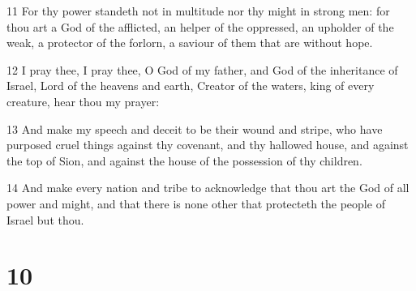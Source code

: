 \par 11 For thy power standeth not in multitude nor thy might in strong men: for thou art a God of the afflicted, an helper of the oppressed, an upholder of the weak, a protector of the forlorn, a saviour of them that are without hope.
\par 12 I pray thee, I pray thee, O God of my father, and God of the inheritance of Israel, Lord of the heavens and earth, Creator of the waters, king of every creature, hear thou my prayer:
\par 13 And make my speech and deceit to be their wound and stripe, who have purposed cruel things against thy covenant, and thy hallowed house, and against the top of Sion, and against the house of the possession of thy children.
\par 14 And make every nation and tribe to acknowledge that thou art the God of all power and might, and that there is none other that protecteth the people of Israel but thou.

\chapter{10}

